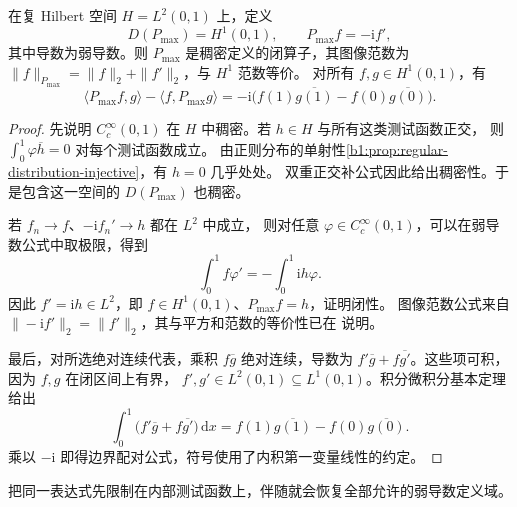 \begin{proposition}[一阶微分算子的边界配对]
\label{b1:prop:29-derivative-boundary}
在复 Hilbert 空间 \(H=L^2(0,1)\) 上，定义
\[
 D(P_{\max})=H^1(0,1),\qquad P_{\max}f=-\mathrm if',
\]
其中导数为弱导数。则 \(P_{\max}\) 是稠密定义的闭算子，其图像范数为
\(\|f\|_{P_{\max}}=\|f\|_2+\|f'\|_2\)，与 \(H^1\) 范数等价。
对所有 \(f,g\in H^1(0,1)\)，有
\begin{equation}\label{b1:eq:29-derivative-boundary}
 \langle P_{\max}f,g\rangle-\langle f,P_{\max}g\rangle
 =-\mathrm i\bigl(f(1)\overline{g(1)}-f(0)\overline{g(0)}\bigr).
\end{equation}
\end{proposition}
\begin{proof}
先说明 \(C_c^\infty(0,1)\) 在 \(H\) 中稠密。若 \(h\in H\) 与所有这类测试函数正交，
则 \(\int_0^1\varphi\overline h=0\) 对每个测试函数成立。
由正则分布的单射性\cref{b1:prop:regular-distribution-injective}，有 \(h=0\) 几乎处处。
双重正交补公式因此给出稠密性。于是包含这一空间的 \(D(P_{\max})\) 也稠密。

若 \(f_n\to f\)、\(-\mathrm if_n'\to h\) 都在 \(L^2\) 中成立，
则对任意 \(\varphi\in C_c^\infty(0,1)\)，可以在弱导数公式中取极限，得到
\[
 \int_0^1 f\varphi'
 =-\int_0^1\mathrm ih\varphi.
\]
因此 \(f'=\mathrm ih\in L^2\)，即 \(f\in H^1(0,1)\)、\(P_{\max}f=h\)，证明闭性。
图像范数公式来自 \(\|-\mathrm if'\|_2=\|f'\|_2\)，其与平方和范数的等价性已在
说明。

最后，对所选绝对连续代表，乘积 \(f\overline g\) 绝对连续，导数为
\(f'\overline g+f\overline{g'}\)。这些项可积，因为 \(f,g\) 在闭区间上有界，
\(f',g'\in L^2(0,1)\subseteq L^1(0,1)\)。积分微积分基本定理给出
\[
 \int_0^1\bigl(f'\overline g+f\overline{g'}\bigr)\,\mathrm dx
 =f(1)\overline{g(1)}-f(0)\overline{g(0)}.
\]
乘以 \(-\mathrm i\) 即得边界配对公式，符号使用了内积第一变量线性的约定。
\end{proof}

把同一表达式先限制在内部测试函数上，伴随就会恢复全部允许的弱导数定义域。


